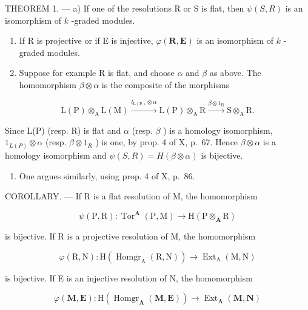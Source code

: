 THEOREM 1. --- a) If one of the resolutions R or S is flat, then \(\psi(S, R)\) is an isomorphism of \(k\) -graded modules.

\begin{enumerate}
\def\labelenumi{\alph{enumi})}
\setcounter{enumi}{1}
\item
  If R is projective or if E is injective, \(\varphi(\mathbf{R},\mathbf{E})\) is an isomorphism of \(k\) -graded modules.
\item
  Suppose for example R is flat, and choose \(\alpha\) and \(\beta\) as above. The homomorphism \(\beta \otimes \alpha\) is the composite of the morphisms
\end{enumerate}

\[
\mathrm{L} (\mathrm{P}) \otimes_ {\mathrm{A}} \mathrm{L} (\mathrm{M}) \xrightarrow {l _ {\mathrm{L} (\mathrm{P})} \otimes \alpha} \mathrm{L} (\mathrm{P}) \otimes_ {\mathrm{A}} \mathrm{R} \xrightarrow {\beta \otimes 1 _ {\mathrm{R}}} \mathrm{S} \otimes_ {\mathrm{A}} \mathrm{R}.
\]

Since L(P) (resp. R) is flat and \(\alpha\) (resp. \(\beta\) ) is a homology isomorphism, \(1_{L(P)} \otimes \alpha\) (resp. \(\beta \otimes 1_R\) ) is one, by prop. 4 of X, p.~67. Hence \(\beta \otimes \alpha\) is a homology isomorphism and \(\psi(S, R) = H(\beta \otimes \alpha)\) is bijective.

\begin{enumerate}
\def\labelenumi{\alph{enumi})}
\setcounter{enumi}{1}
\tightlist
\item
  One argues similarly, using prop. 4 of X, p.~86.
\end{enumerate}

COROLLARY. --- If R is a flat resolution of M, the homomorphism

\[
\psi (\mathrm{P}, \mathrm{R}): \operatorname{Tor} ^ {\mathbf {A}} (\mathrm{P}, \mathrm{M}) \rightarrow \mathrm{H} (\mathrm{P} \otimes_ {\mathbf {A}} \mathrm{R})
\]

is bijective. If R is a projective resolution of M, the homomorphism

\[
\varphi (\mathrm{R}, \mathrm{N}): \mathrm{H} \left(\operatorname{Homgr} _ {\mathrm{A}} (\mathrm{R}, \mathrm{N})\right)\rightarrow \operatorname{Ext} _ {\mathrm{A}} (\mathrm{M}, \mathrm{N})
\]

is bijective. If E is an injective resolution of N, the homomorphism

\[
\varphi (\mathbf {M}, \mathbf {E}): \mathrm{H} \left(\operatorname{Homgr} _ {\mathbf {A}} (\mathbf {M}, \mathbf {E})\right)\rightarrow \operatorname{Ext} _ {\mathbf {A}} (\mathbf {M}, \mathbf {N})
\]

